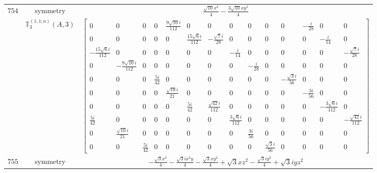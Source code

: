 \documentclass[fleqn,8pt,landscape]{jsarticle}
\begin{document}
\begin{longtable}{ccc}
$ 754 $ & $ \text{symmetry} $ & $ \frac{\sqrt{10} x^{3}}{4} - \frac{3 \sqrt{10} x y^{2}}{4} $ \\
$  $ & $ \mathbb{T}_{3}^{(1,1;a)}(A,3) $ & $ \begin{bmatrix} 0 & 0 & 0 & 0 & \frac{9 \sqrt{10} i}{112} & 0 & 0 & 0 & 0 & 0 & 0 & - \frac{i}{28} & 0 & 0 \\ 0 & 0 & 0 & 0 & 0 & \frac{15 \sqrt{6} i}{112} & - \frac{\sqrt{7} i}{28} & 0 & 0 & 0 & 0 & 0 & - \frac{i}{14} & 0 \\ - \frac{15 \sqrt{6} i}{112} & 0 & 0 & 0 & 0 & 0 & 0 & - \frac{i}{14} & 0 & 0 & 0 & 0 & 0 & - \frac{\sqrt{7} i}{28} \\ 0 & - \frac{9 \sqrt{10} i}{112} & 0 & 0 & 0 & 0 & 0 & 0 & - \frac{i}{28} & 0 & 0 & 0 & 0 & 0 \\ 0 & 0 & 0 & \frac{5 i}{42} & 0 & 0 & 0 & 0 & 0 & 0 & - \frac{\sqrt{3} i}{56} & 0 & 0 & 0 \\ 0 & 0 & 0 & 0 & \frac{\sqrt{10} i}{21} & 0 & 0 & 0 & 0 & 0 & 0 & - \frac{3 i}{56} & 0 & 0 \\ 0 & 0 & 0 & 0 & 0 & \frac{5 i}{42} & \frac{\sqrt{42} i}{112} & 0 & 0 & 0 & 0 & 0 & - \frac{3 \sqrt{6} i}{112} & 0 \\ \frac{5 i}{42} & 0 & 0 & 0 & 0 & 0 & 0 & \frac{3 \sqrt{6} i}{112} & 0 & 0 & 0 & 0 & 0 & - \frac{\sqrt{42} i}{112} \\ 0 & \frac{\sqrt{10} i}{21} & 0 & 0 & 0 & 0 & 0 & 0 & \frac{3 i}{56} & 0 & 0 & 0 & 0 & 0 \\ 0 & 0 & \frac{5 i}{42} & 0 & 0 & 0 & 0 & 0 & 0 & \frac{\sqrt{3} i}{56} & 0 & 0 & 0 & 0 \end{bmatrix} $ \\ \hline
$ 755 $ & $ \text{symmetry} $ & $ - \frac{\sqrt{3} x^{3}}{4} - \frac{\sqrt{3} i x^{2} y}{4} - \frac{\sqrt{3} x y^{2}}{4} + \sqrt{3} x z^{2} - \frac{\sqrt{3} i y^{3}}{4} + \sqrt{3} i y z^{2} $ \\

\end{longtable}
\end{document}
